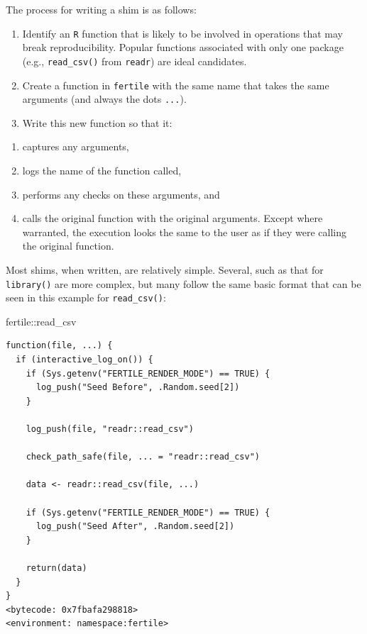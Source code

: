 \documentclass[12pt,twoside]{reedthesis}
\newenvironment{Shaded}{\begin{snugshade}}{\end{snugshade}}
\newcommand{\NormalTok}[1]{#1}
\newcommand{\SpecialCharTok}[1]{\textcolor[rgb]{0.00,0.00,0.00}{#1}}
\providecommand{\tightlist}{%
  \setlength{\itemsep}{0pt}\setlength{\parskip}{0pt}}
\begin{document}
The process for writing a shim is as follows:
\begin{enumerate}
\def\labelenumi{\arabic{enumi}.}
\item
  Identify an \texttt{R} function that is likely to be involved in operations that may break reproducibility. Popular functions associated with only one package (e.g., \texttt{read\_csv()} from \texttt{readr}) are ideal candidates.
\item
  Create a function in \texttt{fertile} with the same name that takes the same arguments (and always the dots \texttt{...}).
\item
  Write this new function so that it:
\end{enumerate}
\begin{enumerate}
\def\labelenumi{\alph{enumi})}
\tightlist
\item
  captures any arguments,
\item
  logs the name of the function called,
\item
  performs any checks on these arguments, and
\item
  calls the original function with the original arguments. Except where warranted, the execution looks the same to the user as if they were calling the original function.
\end{enumerate}
Most shims, when written, are relatively simple. Several, such as that for \texttt{library()} are more complex, but many follow the same basic format that can be seen in this example for \texttt{read\_csv()}:
\begin{Shaded}
\begin{Highlighting}[]
\NormalTok{fertile}\SpecialCharTok{::}\NormalTok{read\_csv}
\end{Highlighting}
\end{Shaded}
\begin{verbatim}
function(file, ...) {
  if (interactive_log_on()) {
    if (Sys.getenv("FERTILE_RENDER_MODE") == TRUE) {
      log_push("Seed Before", .Random.seed[2])
    }

    log_push(file, "readr::read_csv")

    check_path_safe(file, ... = "readr::read_csv")

    data <- readr::read_csv(file, ...)

    if (Sys.getenv("FERTILE_RENDER_MODE") == TRUE) {
      log_push("Seed After", .Random.seed[2])
    }

    return(data)
  }
}
<bytecode: 0x7fbafa298818>
<environment: namespace:fertile>
\end{verbatim}
\end{document}
